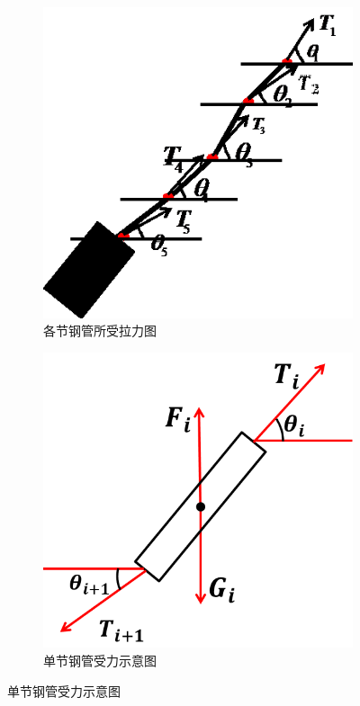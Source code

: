            \begin{figure}[H]
                \centering
                \begin{subfigure}[b]{0.25\textwidth}
                    \includegraphics[width=\textwidth]{images/every_steel_force_analysis.jpg}
                    \caption{各节钢管所受拉力图}
                    \label{fig:各节钢管所受拉力图}
                \end{subfigure}
                \qquad
                \begin{subfigure}[b]{0.25\textwidth}
                    \includegraphics[width=\textwidth]{images/one_steel_force_analysis.jpg}
                    \caption{单节钢管受力示意图}
                    \label{fig:单节钢管受力示意图}
                \end{subfigure}
            \end{figure}
